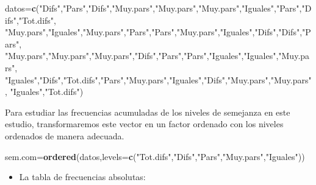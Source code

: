 \documentclass[]{book}
\newenvironment{Shaded}{\begin{snugshade}}{\end{snugshade}}
\newcommand{\DataTypeTok}[1]{\textcolor[rgb]{0.13,0.29,0.53}{#1}}
\newcommand{\KeywordTok}[1]{\textcolor[rgb]{0.13,0.29,0.53}{\textbf{#1}}}
\newcommand{\NormalTok}[1]{#1}
\newcommand{\StringTok}[1]{\textcolor[rgb]{0.31,0.60,0.02}{#1}}
\providecommand{\tightlist}{%
  \setlength{\itemsep}{0pt}\setlength{\parskip}{0pt}}
\theoremstyle{definition}
\theoremstyle{definition}
\theoremstyle{definition}
\theoremstyle{remark}
\begin{document}
\begin{Shaded}
\begin{Highlighting}[]
\NormalTok{datos=}\KeywordTok{c}\NormalTok{(}\StringTok{"Difs"}\NormalTok{,}\StringTok{"Pars"}\NormalTok{,}\StringTok{"Difs"}\NormalTok{,}\StringTok{"Muy.pars"}\NormalTok{,}\StringTok{"Muy.pars"}\NormalTok{,}\StringTok{"Muy.pars"}\NormalTok{,}\StringTok{"Iguales"}\NormalTok{,}\StringTok{"Pars"}\NormalTok{,}\StringTok{"Difs"}\NormalTok{,}\StringTok{"Tot.difs"}\NormalTok{,}
        \StringTok{"Muy.pars"}\NormalTok{,}\StringTok{"Iguales"}\NormalTok{,}\StringTok{"Muy.pars"}\NormalTok{,}\StringTok{"Pars"}\NormalTok{,}\StringTok{"Pars"}\NormalTok{,}\StringTok{"Muy.pars"}\NormalTok{,}\StringTok{"Iguales"}\NormalTok{,}\StringTok{"Difs"}\NormalTok{,}\StringTok{"Difs"}\NormalTok{,}\StringTok{"Pars"}\NormalTok{,}
        \StringTok{"Muy.pars"}\NormalTok{,}\StringTok{"Muy.pars"}\NormalTok{,}\StringTok{"Muy.pars"}\NormalTok{,}\StringTok{"Difs"}\NormalTok{,}\StringTok{"Pars"}\NormalTok{,}\StringTok{"Pars"}\NormalTok{,}\StringTok{"Iguales"}\NormalTok{,}\StringTok{"Iguales"}\NormalTok{,}\StringTok{"Muy.pars"}\NormalTok{,}
        \StringTok{"Iguales"}\NormalTok{,}\StringTok{"Difs"}\NormalTok{,}\StringTok{"Tot.difs"}\NormalTok{,}\StringTok{"Pars"}\NormalTok{,}\StringTok{"Muy.pars"}\NormalTok{,}\StringTok{"Iguales"}\NormalTok{,}\StringTok{"Difs"}\NormalTok{,}\StringTok{"Muy.pars"}\NormalTok{,}\StringTok{"Muy.pars"}\NormalTok{,}
        \StringTok{"Iguales"}\NormalTok{,}\StringTok{"Tot.difs"}\NormalTok{)}
\end{Highlighting}
\end{Shaded}

Para estudiar las frecuencias acumuladas de los niveles de semejanza en este estudio, transformaremos este vector en un factor ordenado con los niveles ordenados de manera adecuada.

\begin{Shaded}
\begin{Highlighting}[]
\NormalTok{sem.com=}\KeywordTok{ordered}\NormalTok{(datos,}\DataTypeTok{levels=}\KeywordTok{c}\NormalTok{(}\StringTok{"Tot.difs"}\NormalTok{,}\StringTok{"Difs"}\NormalTok{,}\StringTok{"Pars"}\NormalTok{,}\StringTok{"Muy.pars"}\NormalTok{,}\StringTok{"Iguales"}\NormalTok{))}
\end{Highlighting}
\end{Shaded}

\begin{itemize}
\tightlist
\item
  La tabla de frecuencias absolutas:
\end{itemize}
\end{document}
